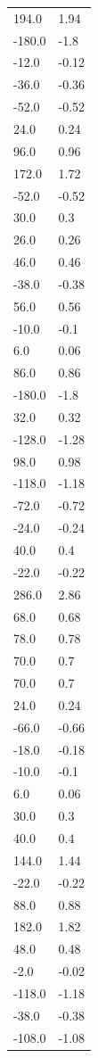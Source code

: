 \begin{longtable}{ll}
194.0 & 1.94 \\
-180.0 & -1.8 \\
-12.0 & -0.12 \\
-36.0 & -0.36 \\
-52.0 & -0.52 \\
24.0 & 0.24 \\
96.0 & 0.96 \\
172.0 & 1.72 \\
-52.0 & -0.52 \\
30.0 & 0.3 \\
26.0 & 0.26 \\
46.0 & 0.46 \\
-38.0 & -0.38 \\
56.0 & 0.56 \\
-10.0 & -0.1 \\
6.0 & 0.06 \\
86.0 & 0.86 \\
-180.0 & -1.8 \\
32.0 & 0.32 \\
-128.0 & -1.28 \\
98.0 & 0.98 \\
-118.0 & -1.18 \\
-72.0 & -0.72 \\
-24.0 & -0.24 \\
40.0 & 0.4 \\
-22.0 & -0.22 \\
286.0 & 2.86 \\
68.0 & 0.68 \\
78.0 & 0.78 \\
70.0 & 0.7 \\
70.0 & 0.7 \\
24.0 & 0.24 \\
-66.0 & -0.66 \\
-18.0 & -0.18 \\
-10.0 & -0.1 \\
6.0 & 0.06 \\
30.0 & 0.3 \\
40.0 & 0.4 \\
144.0 & 1.44 \\
-22.0 & -0.22 \\
88.0 & 0.88 \\
182.0 & 1.82 \\
48.0 & 0.48 \\
-2.0 & -0.02 \\
-118.0 & -1.18 \\
-38.0 & -0.38 \\
-108.0 & -1.08 \\

\end{longtable}
